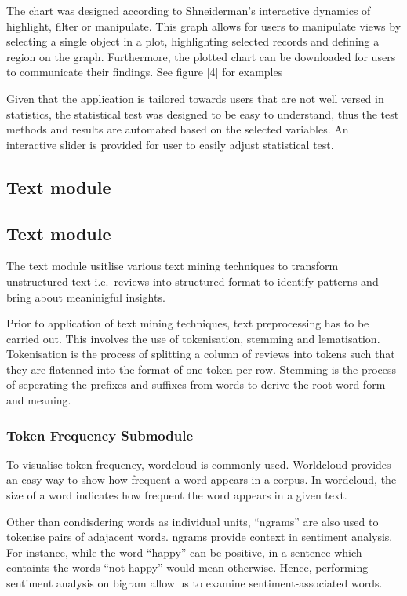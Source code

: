 \documentclass{acm_proc_article-sp}
\begin{document}
The chart was designed according to Shneiderman's interactive dynamics
of highlight, filter or manipulate. This graph allows for users to
manipulate views by selecting a single object in a plot, highlighting
selected records and defining a region on the graph. Furthermore, the
plotted chart can be downloaded for users to communicate their findings.
See figure {[}4{]} for examples

Given that the application is tailored towards users that are not well
versed in statistics, the statistical test was designed to be easy to
understand, thus the test methods and results are automated based on the
selected variables. An interactive slider is provided for user to easily
adjust statistical test.

\hypertarget{text-module}{%
\subsection{Text module}\label{text-module}}

\hypertarget{text-module-1}{%
\subsection{Text module}\label{text-module-1}}

The text module usitlise various text mining techniques to transform
unstructured text i.e.~reviews into structured format to identify
patterns and bring about meaninigful insights.

Prior to application of text mining techniques, text preprocessing has
to be carried out. This involves the use of tokenisation, stemming and
lematisation. Tokenisation is the process of splitting a column of
reviews into tokens such that they are flatenned into the format of
one-token-per-row. Stemming is the process of seperating the prefixes
and suffixes from words to derive the root word form and meaning.

\hypertarget{token-frequency-submodule}{%
\subsubsection{Token Frequency
Submodule}\label{token-frequency-submodule}}

To visualise token frequency, wordcloud is commonly used. Worldcloud
provides an easy way to show how frequent a word appears in a corpus. In
wordcloud, the size of a word indicates how frequent the word appears in
a given text.

Other than condisdering words as individual units, ``ngrams'' are also
used to tokenise pairs of adajacent words. ngrams provide context in
sentiment analysis. For instance, while the word ``happy'' can be
positive, in a sentence which containts the words ``not happy'' would
mean otherwise. Hence, performing sentiment analysis on bigram allow us
to examine sentiment-associated words.
\end{document}
